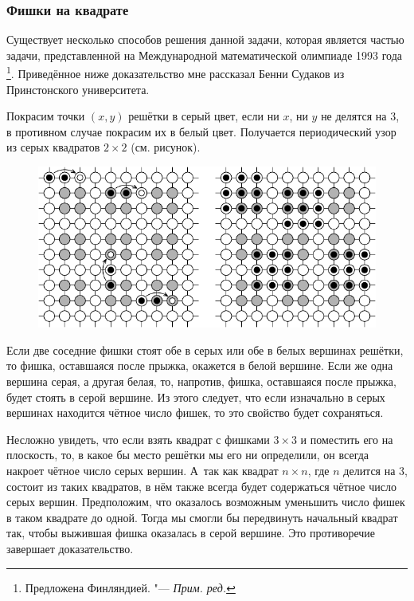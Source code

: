 \documentclass[twoside]{book}
\begin{document}
\subsubsection*{Фишки на квадрате}%

Существует несколько способов решения данной задачи, которая является частью задачи, представленной на Международной математической олимпиаде 1993 года%
\footnote{Предложена Финляндией. "--- \emph{Прим. ред.}}.
Приведённое ниже доказательство мне рассказал Бенни Судаков из Принстонского университета.

\medskip

Покрасим точки $(x, y)$ решётки в серый цвет, если ни $x$, ни $y$ не делятся на $3$, в противном случае покрасим их в белый цвет.
Получается периодический узор из серых квадратов $2\times 2$ (см. рисунок). 

\begin{figure}[ht!]
\centering
\includegraphics{mp/wink-190}
\end{figure}

Если две соседние  фишки стоят обе в серых или обе в белых вершинах решётки, то фишка, оставшаяся после прыжка, окажется в белой вершине.
Если же одна вершина серая, а другая белая, то, напротив, фишка, оставшаяся после прыжка, будет стоять в серой вершине.
Из этого следует, что если изначально в серых вершинах находится чётное число фишек, то это свойство будет сохраняться.

Несложно увидеть, что если взять квадрат с фишками $3\times 3$ и
поместить его на плоскость, то, в какое бы место решётки мы его ни
определили, он всегда накроет чётное число серых вершин.
А~так как
квадрат $n\times n$, где $n$ делится на $3$, состоит из таких
квадратов, в нём также всегда будет содержаться чётное число серых
вершин.
Предположим, что оказалось возможным уменьшить число фишек в
таком квадрате до одной.
Тогда мы смогли бы передвинуть начальный
квадрат так, чтобы выжившая фишка оказалась в серой вершине.
Это
противоречие завершает доказательство. \heart
\end{document}
